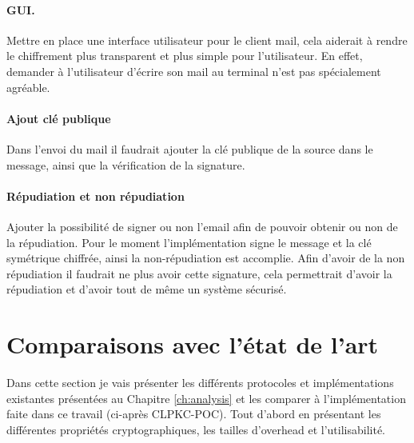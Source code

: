 \paragraph*{GUI.}
Mettre en place une interface utilisateur pour le client mail, cela aiderait à rendre le chiffrement plus transparent et plus simple pour l'utilisateur. En effet, demander à l'utilisateur d'écrire son mail au terminal n'est pas spécialement agréable.
\paragraph*{Ajout clé publique}
Dans l'envoi du mail il faudrait ajouter la clé publique de la source dans le message, ainsi que la vérification de la signature.

\paragraph*{Répudiation et non répudiation}
Ajouter la possibilité de signer ou non l'email afin de pouvoir obtenir ou non de la répudiation. Pour le moment l'implémentation signe le message et la clé symétrique chiffrée, ainsi la non-répudiation est accomplie. Afin d'avoir de la non répudiation il faudrait ne plus avoir cette signature, cela permettrait d'avoir la répudiation et d'avoir tout de même un système sécurisé.

\section{Comparaisons avec l'état de l'art}
Dans cette section je vais présenter les différents protocoles et implémentations existantes présentées au Chapitre \ref{ch:analysis} et les comparer à l'implémentation faite dans ce travail (ci-après CLPKC-POC). Tout d'abord en présentant les différentes propriétés cryptographiques, les tailles d'overhead et l'utilisabilité.

